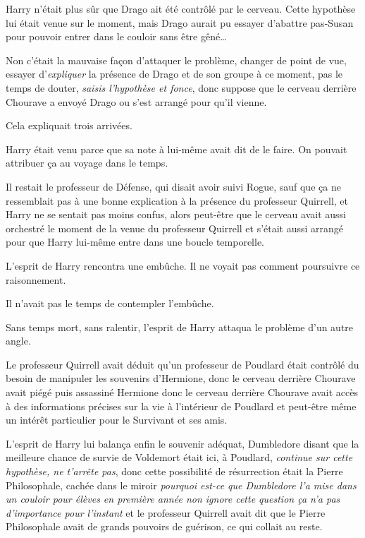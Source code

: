 Harry n'était plus sûr que Drago ait été contrôlé par le cerveau. Cette hypothèse lui était venue sur le moment, mais Drago aurait pu essayer d'abattre pas-Susan pour pouvoir entrer dans le couloir sans être gêné…

Non c'était la mauvaise façon d'attaquer le problème, changer de point de vue, essayer d'\emph{expliquer} la présence de Drago et de son groupe à ce moment, pas le temps de douter, \emph{saisis l'hypothèse et fonce}, donc suppose que le cerveau derrière Chourave a envoyé Drago ou s'est arrangé pour qu'il vienne.

Cela expliquait trois arrivées.

Harry était venu parce que sa note à lui-même avait dit de le faire. On pouvait attribuer ça au voyage dans le temps.

Il restait le professeur de Défense, qui disait avoir suivi Rogue, sauf que ça ne ressemblait pas à une bonne explication à la présence du professeur Quirrell, et Harry ne se sentait pas moins confus, alors peut-être que le cerveau avait aussi orchestré le moment de la venue du professeur Quirrell et s'était aussi arrangé pour que Harry lui-même entre dans une boucle temporelle.

L'esprit de Harry rencontra une embûche. Il ne voyait pas comment poursuivre ce raisonnement.

Il n'avait pas le temps de contempler l'embûche.

Sans temps mort, sans ralentir, l'esprit de Harry attaqua le problème d'un autre angle.

Le professeur Quirrell avait déduit qu'un professeur de Poudlard était contrôlé du besoin de manipuler les souvenirs d'Hermione, donc le cerveau derrière Chourave avait piégé puis assassiné Hermione donc le cerveau derrière Chourave avait accès à des informations précises sur la vie à l'intérieur de Poudlard et peut-être même un intérêt particulier pour le Survivant et ses amis.

L'esprit de Harry lui balança enfin le souvenir adéquat, Dumbledore disant que la meilleure chance de survie de Voldemort était ici, à Poudlard, \emph{continue sur cette hypothèse, ne t'arrête pas}, donc cette possibilité de résurrection était la Pierre Philosophale, cachée dans le miroir \emph{pourquoi est-ce que Dumbledore l'a mise dans un couloir pour élèves en première année non ignore cette question ça n'a pas d'importance pour l'instant} et le professeur Quirrell avait dit que le Pierre Philosophale avait de grands pouvoirs de guérison, ce qui collait au reste.

